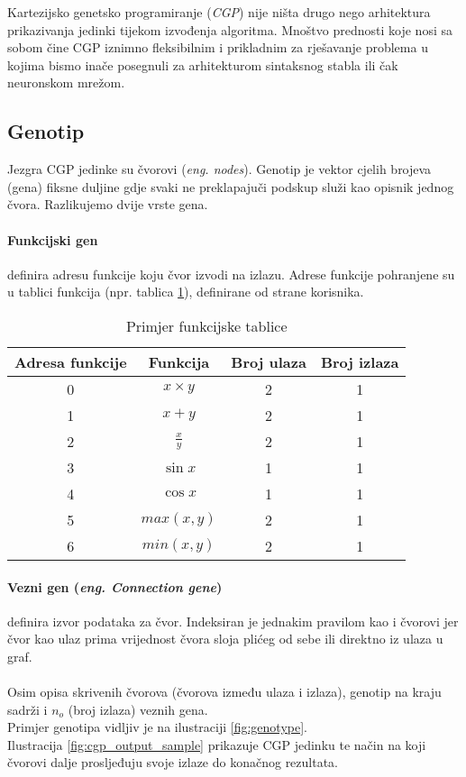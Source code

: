 Kartezijsko genetsko programiranje (\emph{CGP}) nije ništa drugo nego arhitektura prikazivanja jedinki tijekom izvođenja algoritma. 
Mnoštvo prednosti koje nosi sa sobom čine CGP iznimno fleksibilnim i prikladnim za rješavanje problema u kojima bismo inače posegnuli za arhitekturom sintaksnog stabla ili čak neuronskom mrežom.

\subsection{Genotip}
Jezgra CGP jedinke su čvorovi (\emph{eng. nodes}).
Genotip je vektor cjelih brojeva (gena) fiksne duljine gdje svaki ne preklapajuči podskup služi kao opisnik jednog čvora.
Razlikujemo dvije vrste gena.

\paragraph{Funkcijski gen}
definira adresu funkcije koju čvor izvodi na izlazu.
Adrese funkcije pohranjene su u tablici funkcija (npr. tablica \ref{table:function_table}), definirane od strane korisnika.

\begin{table}
	\centering
	\begin{tabular}{||c c c c||}
		\hline
		Adresa funkcije & Funkcija & Broj ulaza & Broj izlaza\\ [0.5ex]
		\hline\hline
		0 & $x \times y$ & 2 & 1\\
		1 & $x + y$  & 2 & 1\\
		2 & $\frac{x}{y}$ & 2 & 1\\
		3 & $\sin{x}$ & 1 & 1\\
		4 & $\cos{x}$ & 1 & 1\\ 
		5 & $max(x, y)$ & 2 & 1\\
		6 & $min(x, y)$ & 2 & 1\\ [1ex]
		\hline
	\end{tabular}
	\caption{Primjer funkcijske tablice}
	\label{table:function_table}
\end{table}

\paragraph{Vezni gen (\emph{eng. Connection gene})}
definira izvor podataka za čvor.
Indeksiran je jednakim pravilom kao i čvorovi jer čvor kao ulaz prima vrijednost čvora sloja plićeg od sebe ili direktno iz ulaza u graf. \\
\\
Osim opisa skrivenih čvorova (čvorova između ulaza i izlaza), genotip na kraju sadrži i $n_o$ (broj izlaza) veznih gena. \\
Primjer genotipa vidljiv je na ilustraciji \ref{fig:genotype}. \\
Ilustracija \ref{fig:cgp_output_sample} prikazuje CGP jedinku te način na koji čvorovi dalje prosljeđuju svoje izlaze do konačnog rezultata.

